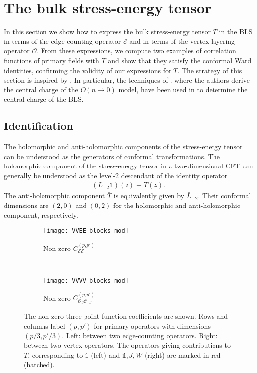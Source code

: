 \documentclass[a4paper,11pt]{article}
\begin{document}
\section{The bulk stress-energy tensor} \label{sec:bulk-stress}

In this section we show how to express the bulk stress-energy tensor $T$ in the BLS in terms of the edge counting operator $\mathcal{E}$ and in terms of the vertex layering operator $\mathcal{O}$.
From these expressions, we compute two examples of correlation functions of primary fields with $T$ and show that they satisfy the conformal Ward identities, confirming the validity of our expressions for $T$.
The strategy of this section is inspired by \cite{Doyon_2006,Gamsa_2006}. In particular, the techniques of \cite{Gamsa_2006}, where the authors derive the central charge of the $O(n \to 0)$ model, have been used in \cite{camia2021scalar} to determine the central charge of the BLS.


\subsection{Identification}

The holomorphic and anti-holomorphic components of the stress-energy tensor can be understood as the generators of conformal transformations.
The holomorphic component of the stress-energy tensor in a two-dimensional CFT can generally be understood as the level-2 descendant of the identity operator
\begin{align} \label{def:L2T}
    (L_{-2} \mathbb{1})(z) \equiv T(z).
\end{align}
The anti-holomorphic component $\bar{T}$ is equivalently given by $\bar{L}_{-2}$. Their conformal dimensions are $(2,0)$ and $(0,2)$ for the holomorphic and anti-holomorphic component, respectively.

\begin{figure}[t]
    \centering
    \begin{subfigure}[b]{0.4\textwidth}
        \texttt{[image: VVEE\_blocks\_mod]}
        \caption{Non-zero $C_{\mathcal{E}\mathcal{E}}^{(p,p')}$}
        \label{VVEE_blocks}
    \end{subfigure} ~
    \begin{subfigure}[b]{0.4\textwidth}
        \texttt{[image: VVVV\_blocks\_mod]}
        \caption{Non-zero $C_{\mathcal{O}_\beta \mathcal{O}_{-\beta}}^{(p,p')}$}
        \label{VVVV_blocks}
    \end{subfigure}
    \caption{The non-zero three-point function coefficients are shown. Rows and columns label $(p,p')$ for primary operators with dimensions $(p/3, p'/3)$.  Left: between two edge-counting operators. Right: between two vertex operators.
    The operators giving contributions to $T$, corresponding to $\mathbb{1}$ (left) and $\mathbb{1}, J, W$ (right) are marked in red (hatched).}
    \label{checkerboard}
\end{figure}
\end{document}
